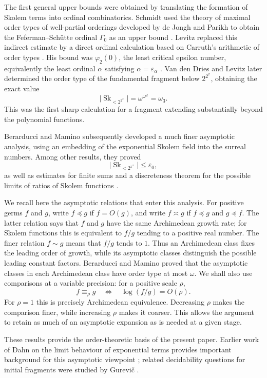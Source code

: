 \documentclass[11pt]{article}
\theoremstyle{definition}
\theoremstyle{remark}
\newcommand{\Sk}{\operatorname{Sk}}
\newcommand{\arch}{\mathrel{\asymp}}
\numberwithin{equation}{section}
\begin{document}
The first general upper bounds were obtained by translating the
formation of Skolem terms into ordinal combinatorics.  Schmidt used the
theory of maximal order types of well-partial orderings developed by
de Jongh and Parikh \cite{deJonghParikh1977} to obtain the
Feferman--Sch\"utte ordinal $\Gamma_0$ as an upper bound
\cite{Schmidt1978}.  Levitz replaced this indirect estimate by a direct
ordinal calculation based on Carruth's arithmetic of order types
\cite{Carruth1942}.  His bound was $\varphi_2(0)$, the least critical
epsilon number, equivalently the least ordinal $\alpha$ satisfying
$\alpha=\varepsilon_\alpha$ \cite{Levitz1978}.  Van den Dries and
Levitz later determined the order type of the fundamental fragment
below $2^{2^x}$, obtaining the exact value \cite{DriesLevitz1984}
\[
 \bigl|\Sk_{<2^{2^x}}\bigr|=\omega^{\omega^\omega}=\omega_3.
\]
This was the first sharp calculation for a fragment extending
substantially beyond the polynomial functions.

Berarducci and Mamino subsequently developed a much finer asymptotic
analysis, using an embedding of the exponential Skolem field into the
surreal numbers.  Among other results, they proved
\[
 \bigl|\Sk_{<2^{x^x}}\bigr|\le\varepsilon_0,
\]
as well as estimates for finite sums and a discreteness theorem for
the possible limits of ratios of Skolem functions \cite{BM}.

We recall here the asymptotic relations that enter this analysis.
For positive germs $f$ and $g$, write $f\preceq g$ if $f=O(g)$,
and write $f\arch g$ if $f\preceq g$ and $g\preceq f$.  The latter
relation says that $f$ and $g$ have the same Archimedean growth rate;
for Skolem functions this is equivalent to $f/g$ tending to a positive
real number.  The finer relation $f\sim g$ means that $f/g$ tends to
$1$.  Thus an Archimedean class fixes the leading order of growth,
while its asymptotic classes distinguish the possible leading constant
factors.  Berarducci and Mamino proved that the asymptotic classes in
each Archimedean class have order type at most $\omega$.  We shall also
use comparisons at a variable precision: for a positive scale $\rho$,
\[
 f\equiv_\rho g
 \quad\Longleftrightarrow\quad
 \log(f/g)=O(\rho).
\]
For $\rho=1$ this is precisely Archimedean equivalence.  Decreasing
$\rho$ makes the comparison finer, while increasing $\rho$ makes it
coarser.  This allows the argument to retain as much of an asymptotic
expansion as is needed at a given stage.

These results provide the order-theoretic basis of the present paper. Earlier work of
Dahn on the limit behaviour of exponential terms provides important
background for this asymptotic viewpoint \cite{Dahn1984}; related
decidability questions for initial fragments were studied by Gurevi\v{c}
\cite{Gurevic1986}.
\end{document}
